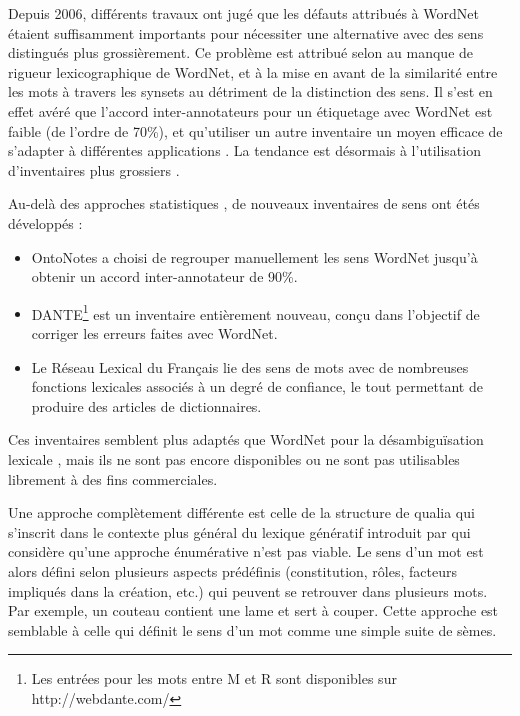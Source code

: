 Depuis 2006, différents travaux \citep{hovy2006ontonotes,navigli2007semeval}
ont jugé que les défauts attribués à WordNet
\citep{boyd2006adding,ide2006making,snow2007learning} étaient suffisamment
importants pour nécessiter une alternative avec des sens distingués plus
grossièrement. Ce problème est attribué selon \cite{edmonds2002introduction} au
manque de rigueur lexicographique de WordNet, et à la mise en avant de la
similarité entre les mots à travers les synsets au détriment de la distinction
des sens. Il s'est en effet avéré que l'accord inter-annotateurs pour un
étiquetage avec WordNet est faible (de l'ordre de 70\%), et qu'utiliser un
autre inventaire un moyen efficace de s'adapter à différentes applications
\citep{palmer2004different}. La tendance est désormais à l'utilisation
d'inventaires plus grossiers \citep{navigli2007semeval,navigli2012quick}.

Au-delà des approches statistiques \citep{snow2007learning}, de nouveaux
inventaires de sens ont étés développés :

\begin{itemize}

    \item OntoNotes \citep{hovy2006ontonotes} a choisi de regrouper
        manuellement les sens WordNet jusqu'à obtenir un accord
        inter-annotateur de 90\%.

    \item DANTE\footnote{Les entrées pour les mots entre M et R sont
        disponibles sur http://webdante.com/} \citep{mccarthy2010dante} est un
        inventaire entièrement nouveau, conçu dans l'objectif de corriger les
        erreurs faites avec WordNet\citep{kilgarriff2010detailed}.

    \item Le Réseau Lexical du Français\citep{gader2014lexicon} lie des sens de
        mots avec de nombreuses fonctions lexicales associés à un degré de
        confiance, le tout permettant de produire des articles de dictionnaires.

\end{itemize}

Ces inventaires semblent plus adaptés que WordNet pour la désambiguïsation
lexicale \citep{navigli2012quick}, mais ils ne sont pas encore disponibles ou
ne sont pas utilisables librement à des fins commerciales.

Une approche complètement différente est celle de la structure de qualia
\citep{johnston1996qualia} qui s'inscrit dans le contexte plus général du
lexique génératif introduit par \cite{pustejovsky1991generative} qui considère
qu'une approche énumérative n'est pas viable. Le sens d'un mot est alors défini
selon plusieurs aspects prédéfinis (constitution, rôles, facteurs impliqués
dans la création, etc.) qui peuvent se retrouver dans plusieurs mots. Par
exemple, un couteau contient une lame et sert à couper. Cette approche est
semblable à celle qui définit le sens d'un mot comme une simple suite de sèmes.

